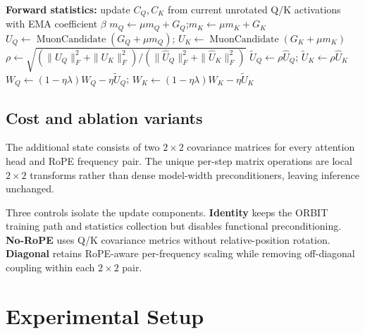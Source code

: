 \begin{algorithm}[t]
\caption{ORBIT update for a RoPE query--key projection pair}
\label{alg:orbit}
\DontPrintSemicolon
{}
\textbf{Forward statistics:} update $C_Q,C_K$ from current unrotated Q/K activations
with EMA coefficient $\beta$\;
$m_Q \leftarrow \mu m_Q+G_Q$;\quad $m_K \leftarrow \mu m_K+G_K$\;
$U_Q \leftarrow \operatorname{MuonCandidate}(G_Q+\mu m_Q)$;\quad
$U_K \leftarrow \operatorname{MuonCandidate}(G_K+\mu m_K)$\;
$\rho\leftarrow
\sqrt{(\|U_Q\|_F^2+\|U_K\|_F^2)/
(\|\widehat U_Q\|_F^2+\|\widehat U_K\|_F^2)}$\;
$\widetilde U_Q\leftarrow\rho\widehat U_Q$;\quad
$\widetilde U_K\leftarrow\rho\widehat U_K$\;
$W_Q\leftarrow(1-\eta\lambda)W_Q-\eta\widetilde U_Q$;\quad
$W_K\leftarrow(1-\eta\lambda)W_K-\eta\widetilde U_K$\;
\end{algorithm}

\subsection{Cost and ablation variants}
The additional state consists of two $2\times2$ covariance matrices for every attention
head and RoPE frequency pair. The unique per-step matrix operations are local $2\times2$
transforms rather than dense model-width preconditioners, leaving inference unchanged.

Three controls isolate the update components. \textbf{Identity} keeps the ORBIT training
path and statistics collection but disables functional preconditioning. \textbf{No-RoPE}
uses Q/K covariance metrics without relative-position rotation. \textbf{Diagonal} retains
RoPE-aware per-frequency scaling while removing off-diagonal coupling within each
$2\times2$ pair.

\section{Experimental Setup}
